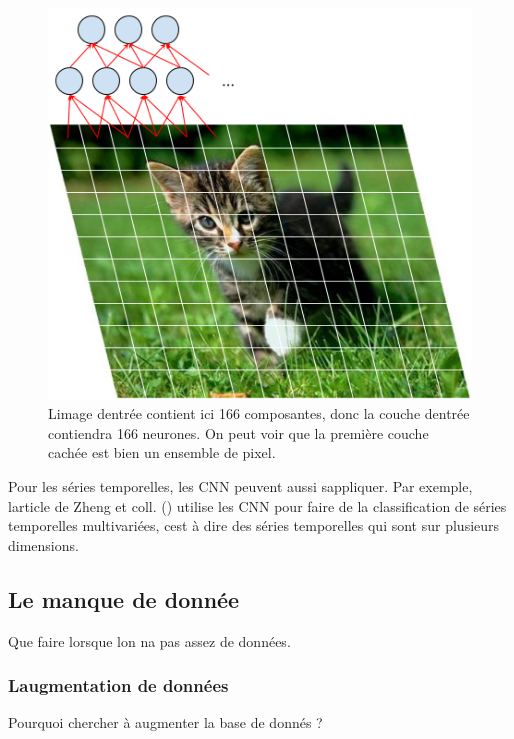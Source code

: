 \documentclass[11pt]{sdm}
\begin{document}
			\begin{figure}[!ht]
				\centering
				\includegraphics[natwidth=474,natheight=504,scale=0.6]{figures/cnnOnImage.png}
				\caption{L\textquotesingle image d\textquotesingle entr\'ee contient ici 166 composantes, donc la couche d\textquotesingle entr\'ee contiendra 166 neurones. On peut voir que la premi\`ere couche cach\'ee est bien un ensemble de pixel.}
				\label{fig:cnnChat}
			\end{figure}

			Pour les s\'eries temporelles, les CNN peuvent aussi s\textquotesingle appliquer. Par exemple, l\textquotesingle article de Zheng et coll. (\cite{zheng2014time}) utilise les CNN pour faire de la classification de s\'eries temporelles multivari\'ees, c\textquotesingle est \`a dire des s\'eries temporelles qui sont sur plusieurs dimensions.

	\subsection{Le manque de donn\'ee}
	\label{seq:noData}
		Que faire lorsque l\textquotesingle on n\textquotesingle a pas assez de donn\'ees.

		\subsubsection{L\textquotesingle augmentation de donn\'ees}
		\label{seq:dataAugmentation}
			\medbreak

			\begin{itshape}{Pourquoi chercher \`a augmenter la base de donn\'es ?}\end{itshape}
\end{document}
